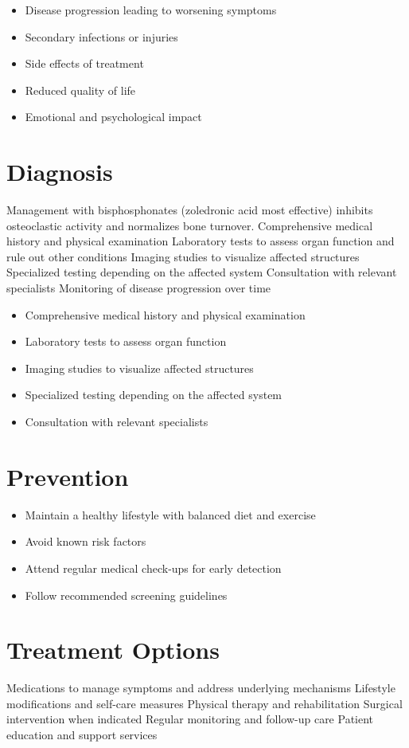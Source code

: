 \begin{itemize}[noitemsep]
  \item Disease progression leading to worsening symptoms
  \item Secondary infections or injuries
  \item Side effects of treatment
  \item Reduced quality of life
  \item Emotional and psychological impact
\end{itemize}
\section{Diagnosis}
Management with bisphosphonates (zoledronic acid most effective) inhibits osteoclastic activity and normalizes bone turnover. Comprehensive medical history and physical examination Laboratory tests to assess organ function and rule out other conditions Imaging studies to visualize affected structures Specialized testing depending on the affected system Consultation with relevant specialists Monitoring of disease progression over time

\begin{itemize}[noitemsep]
  \item Comprehensive medical history and physical examination
  \item Laboratory tests to assess organ function
  \item Imaging studies to visualize affected structures
  \item Specialized testing depending on the affected system
  \item Consultation with relevant specialists
\end{itemize}
\section{Prevention}
\begin{itemize}[noitemsep]
  \item Maintain a healthy lifestyle with balanced diet and exercise
  \item Avoid known risk factors
  \item Attend regular medical check-ups for early detection
  \item Follow recommended screening guidelines
\end{itemize}
\section{Treatment Options}
Medications to manage symptoms and address underlying mechanisms Lifestyle modifications and self-care measures Physical therapy and rehabilitation Surgical intervention when indicated Regular monitoring and follow-up care Patient education and support services

